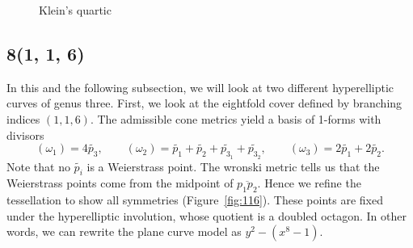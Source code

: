 \documentclass[12pt,reqno]{amsart}
\theoremstyle{definition}
\theoremstyle{remark}
\begin{document}
\begin{figure}[htbp]
    \centering
    \qquad
    \caption{Klein's quartic}%
    \label{fig:124}%
\end{figure}

\subsection*{8(1, 1, 6)}
In this and the following subsection, we will look at two different hyperelliptic curves of genus three. First, we look at the eightfold cover defined by branching indices $(1, 1, 6).$ The admissible cone metrics yield a basis of 1-forms with divisors $$(\omega_1) = 4 \widetilde{p_3}, \qquad (\omega_2) = \widetilde{p_1} + \widetilde{p_2} + \widetilde{p_{3_1}} + \widetilde{p_{3_2}}, \qquad (\omega_3) = 2 \widetilde{p_1} + 2 \widetilde{p_2}.$$ Note that no $\widetilde{p_i}$ is a Weierstrass point. The wronski metric tells us that the Weierstrass points come from the midpoint of $\overline{p_1 p_2}.$ Hence we refine the tessellation to show all symmetries (Figure~\ref{fig:116}). These points are fixed under the hyperelliptic involution, whose quotient is a doubled octagon. In other words, we can rewrite the plane curve model as $y^2 - (x^8 - 1).$ 
\end{document}
